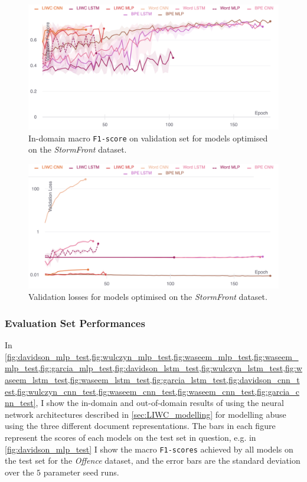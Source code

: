\begin{figure}  
    \centering  
    \includegraphics[width=\textwidth]{garcia_dev_f1.pdf}  
    \caption{In-domain macro \texttt{F1-score} on validation set for models optimised on the \textit{StormFront} dataset.}  
    \label{fig:garcia_dev_f1}  
\end{figure}  
\begin{figure}  
    \centering  
    \includegraphics[width=\textwidth]{garcia_dev_loss_stderr_logscale.pdf}  
    \caption{Validation losses for models optimised on the \textit{StormFront} dataset.}  
    \label{fig:garcia_dev_loss}  
\end{figure}  
  
\subsubsection{Evaluation Set Performances}  
In \cref{fig:davidson_mlp_test,fig:wulczyn_mlp_test,fig:waseem_mlp_test,fig:waseem_mlp_test,fig:garcia_mlp_test,fig:davidson_lstm_test,fig:wulczyn_lstm_test,fig:waseem_lstm_test,fig:waseem_lstm_test,fig:garcia_lstm_test,fig:davidson_cnn_test,fig:wulczyn_cnn_test,fig:waseem_cnn_test,fig:waseem_cnn_test,fig:garcia_cnn_test}, I show the in-domain and out-of-domain results of using the neural network architectures described in \cref{sec:LIWC_modelling} for modelling abuse using the three different document representations.  
The bars in each figure represent the scores of each models on the test set in question, e.g. in \cref{fig:davidson_mlp_test} I show the macro \texttt{F1-scores} achieved by all models on the test set for the \textit{Offence} dataset, and the error bars are the standard deviation over the $5$ parameter seed runs.  
  
